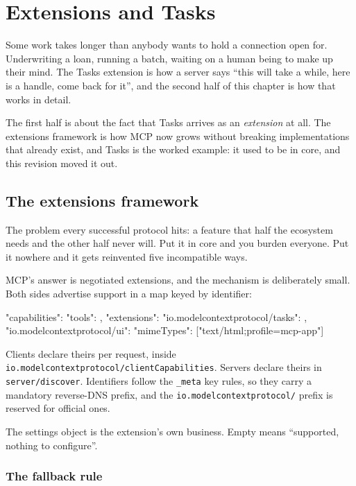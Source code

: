 \chapter{Extensions and Tasks}
\label{ch:tasks}

Some work takes longer than anybody wants to hold a connection open for.
Underwriting a loan, running a batch, waiting on a human being to make up their
mind. The Tasks extension is how a server says ``this will take a while, here is
a handle, come back for it'', and the second half of this chapter is how that
works in detail.

The first half is about the fact that Tasks arrives as an \emph{extension} at
all. The extensions framework is how MCP now grows without breaking
implementations that already exist, and Tasks is the worked example: it used to
be in core, and this revision moved it out.

\section{The extensions framework}

The problem every successful protocol hits: a feature that half the ecosystem
needs and the other half never will. Put it in core and you burden everyone. Put
it nowhere and it gets reinvented five incompatible ways.

MCP's answer is negotiated extensions, and the mechanism is deliberately small.
Both sides advertise support in a map keyed by identifier:

\begin{wire}
{
  "capabilities": {
    "tools": {},
    "extensions": {
      "io.modelcontextprotocol/tasks": {},
      "io.modelcontextprotocol/ui": {
        "mimeTypes": ["text/html;profile=mcp-app"]
      }
    }
  }
}
\end{wire}

Clients declare theirs per request, inside
\texttt{io.modelcontextprotocol/clientCapabilities}. Servers declare theirs in
\texttt{server/discover}. Identifiers follow the \texttt{\_meta} key rules, so
they carry a mandatory reverse-DNS prefix, and the
\texttt{io.modelcontextprotocol/} prefix is reserved for official ones.

The settings object is the extension's own business. Empty means ``supported,
nothing to configure''.

\subsection{The fallback rule}

